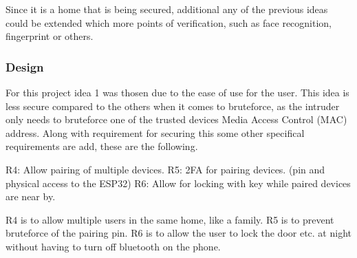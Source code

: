 Since it is a home that is being secured, additional any of the previous ideas could be extended which more points of verification, such as face recognition, fingerprint or others.

\subsubsection{Design}
For this project idea 1 was thosen due to the ease of use for the user. This idea is less secure compared to the others when it comes to bruteforce, as the intruder only needs to bruteforce one of the trusted devices Media Access Control (MAC) address. Along with requirement for securing this some other specifical requirements are add, these are the following.

R4: Allow pairing of multiple devices.
R5: 2FA for pairing devices. (pin and physical access to the ESP32)
R6: Allow for locking with key while paired devices are near by.

R4 is to allow multiple users in the same home, like a family. R5 is to prevent bruteforce of the pairing pin. R6 is to allow the user to lock the door etc. at night without having to turn off bluetooth on the phone.